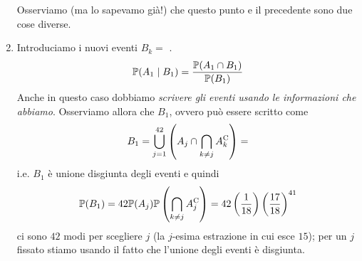 \begin{enumerate}
	\begin{oss}
		Osserviamo (ma lo sapevamo già!) che questo punto e il precedente sono due cose diverse.
	\end{oss}
	\item Introduciamo i nuovi eventi $B_{k} =$ .
	\begin{equation*}
		\mathbb{P}(A_{1} \mid B_{1}) =\frac{\mathbb{P}(A_{1} \cap B_{1})}{\mathbb{P}(B_{1})}
	\end{equation*}
	Anche in questo caso dobbiamo \textit{scrivere gli eventi usando le informazioni che abbiamo}. Osserviamo allora che $B_{1}$, ovvero  può essere scritto come
	\begin{equation*}
		B_{1} =\bigcup_{j=1}^{42}\left(A_{j} \cap \bigcap_{k\neq j} A_{k}^{\mathrm{C}}\right) =
	\end{equation*}
	i.e. $B_{1}$ è unione disgiunta degli eventi  e quindi
	\begin{equation*}
		\mathbb{P}(B_{1}) =42\mathbb{P}(A_{j})\mathbb{P}\left(\bigcap_{k\neq j} A_{j}^{\mathrm{C}}\right) =42\left(\frac{1}{18}\right)\left(\frac{17}{18}\right)^{41}
	\end{equation*}
	ci sono $42$ modi per scegliere $j$ (la $j$-esima estrazione in cui esce $15$); per un $j$ fissato stiamo usando il fatto che l'unione degli eventi è disgiunta.


\end{enumerate}
